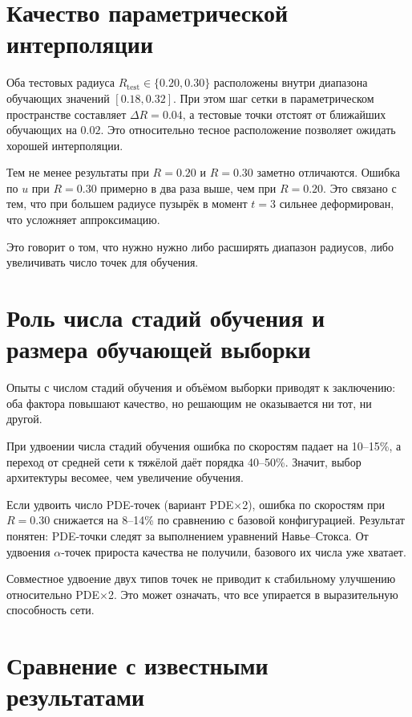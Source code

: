 \section{Качество параметрической интерполяции}

Оба тестовых радиуса \(R_{\mathrm{test}}\in\{0.20,0.30\}\) расположены внутри
диапазона обучающих значений \([0.18, 0.32]\). При этом шаг сетки в
параметрическом пространстве составляет \(\Delta R = 0.04\), а тестовые точки
отстоят от ближайших обучающих на \(0.02\). Это относительно тесное расположение
позволяет ожидать хорошей интерполяции.

Тем не менее результаты при \(R=0.20\) и \(R=0.30\) заметно отличаются.
Ошибка по \(u\) при \(R=0.30\) примерно в два раза выше, чем при \(R=0.20\).
Это связано с тем, что при большем радиусе пузырёк в момент \(t=3\)
сильнее деформирован, что усложняет аппроксимацию.

Это говорит о том, что нужно нужно либо расширять диапазон радиусов, либо увеличивать число точек для обучения.

\section{Роль числа стадий обучения и размера обучающей выборки}

Опыты с числом стадий обучения и объёмом выборки приводят к
заключению: оба фактора повышают качество, но решающим не оказывается ни тот,
ни другой.

При удвоении числа стадий обучения ошибка по
скоростям падает на 10--15\%, а переход от средней сети к тяжёлой даёт порядка 40--50\%. Значит,
выбор архитектуры весомее, чем увеличение обучения.

Если удвоить число PDE-точек (вариант PDE$\times$2), ошибка по скоростям при
\(R=0.30\) снижается на 8--14\% по сравнению с базовой конфигурацией. Результат
понятен: PDE-точки следят за выполнением уравнений Навье--Стокса. От удвоения \(\alpha\)-точек прироста качества не получили, базового
их числа уже хватает.

Совместное удвоение двух типов точек не приводит к стабильному улучшению
относительно PDE$\times$2. Это может означать, что все упирается в выразительную способность сети.

\section{Сравнение с известными результатами}

